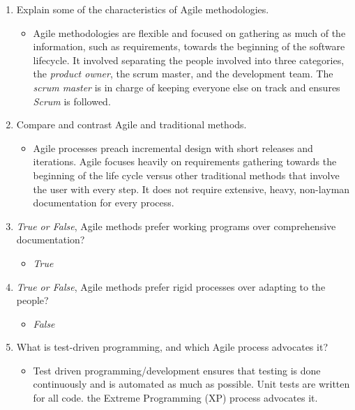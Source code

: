\documentclass[11pt]{article}
\begin{document}
\begin{enumerate}
    \newpage
    \item Explain some of the characteristics of Agile methodologies.
    \begin{itemize}
    \item Agile methodologies are flexible and focused on gathering as much of the information, such as requirements, towards the beginning of the software lifecycle. It involved separating the people involved into three categories, the \textit{product owner}, the {scrum master}, and the {development team}. The \textit{scrum master} is in charge of keeping everyone else on track and ensures \textit{Scrum} is followed.
    \end{itemize}
    
    \item Compare and contrast Agile and traditional methods. 
    \begin{itemize}
        \item Agile processes preach incremental design with short releases and iterations. Agile focuses heavily on requirements gathering towards the beginning of the life cycle versus other traditional methods that involve the user with every step. It does not require extensive, heavy, non-layman documentation for every process. 
    \end{itemize}
    
    \item \textit{True or False}, Agile methods prefer working programs over comprehensive documentation?
    \begin{itemize}
    \item \textit{True}
    \end{itemize}
    
    \item \textit{True or False}, Agile methods prefer rigid processes over adapting to the people?
    \begin{itemize}
    \item \textit{False}
    \end{itemize}
    
    \item What is test-driven programming, and which Agile process advocates it?
    \begin{itemize}
        \item Test driven programming/development ensures that testing is done continuously and is automated as much as possible. Unit tests are written for all code. the Extreme Programming (XP) process advocates it.
    \end{itemize}
    

\end{enumerate}
\end{document}
